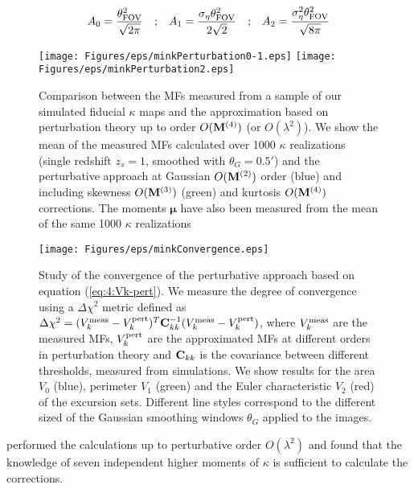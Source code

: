 \begin{equation}
\label{eq:4:amplitude}
\begin{matrix}
\displaystyle A_0 = \frac{\theta_{\rm FOV}^2}{\sqrt{2\pi}} & ; & \displaystyle A_1 = \frac{\sigma_\eta\theta_{\rm FOV}^2}{2\sqrt{2}} & ; & \displaystyle A_2 = \frac{\sigma_\eta^2\theta^2_{\rm FOV}}{\sqrt{8\pi}}
\end{matrix}
\end{equation}
%
\begin{figure}
\begin{center}
\texttt{[image: Figures/eps/minkPerturbation0-1.eps]}
\texttt{[image: Figures/eps/minkPerturbation2.eps]}
\end{center}
\caption{Comparison between the MFs measured from a sample of our simulated fiducial $\kappa$ maps and the approximation based on perturbation theory up to order $O(\mathbf{M}^{(4)})$ (or $O(\lambda^2)$). We show the mean of the measured MFs calculated over 1000 $\kappa$ realizations (single redshift $z_s=1$, smoothed with $\theta_G=0.5'$) and the perturbative approach at Gaussian $O(\mathbf{M}^{(2)})$ order (blue) and including skewness $O(\mathbf{M}^{(3)})$ (green) and kurtosis $O(\mathbf{M}^{(4)})$ corrections. The moments $\pmb{\mu}$ have also been measured from the mean of the same 1000 $\kappa$ realizations}
\label{fig:4:minkpert}
\end{figure}
%
\begin{figure}
\begin{center}
\texttt{[image: Figures/eps/minkConvergence.eps]}
\end{center}
\caption{Study of the convergence of the perturbative approach based on equation (\ref{eq:4:Vk-pert}). We measure the degree of convergence using a $\Delta\chi^2$ metric defined as $\Delta\chi^2=(V_k^{\rm meas}-V_k^{\rm pert})^T\mathbf{C}_{kk}^{-1}(V_k^{\rm meas}-V_k^{\rm pert})$, where $V_k^{\rm meas}$ are the measured MFs, $V_k^{\rm pert}$ are the approximated MFs at different orders in perturbation theory and $\mathbf{C}_{kk}$ is the covariance between different thresholds, measured from simulations. We show results for the area $V_0$ (blue), perimeter $V_1$ (green) and the Euler characteristic $V_2$ (red) of the excursion sets. Different line styles correspond to the different sized of the Gaussian smoothing windows $\theta_G$ applied to the images.}
\label{fig:4:minkconv}
\end{figure}
%
\citep{Munshi12} performed the calculations up to perturbative order $O(\lambda^2)$ and found that the knowledge of seven independent higher moments of $\kappa$ is sufficient to calculate the corrections. 


